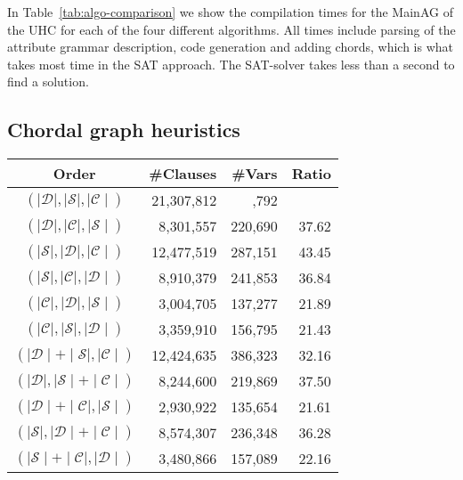 \documentclass{llncs}
\newcommand{\tabref}[1]{Table~\ref{#1}}
\begin{document}
In \tabref{tab:algo-comparison} we show the compilation times for the MainAG of the UHC for each of the four different algorithms. All times include parsing of the attribute grammar description, code generation and adding chords, which is what takes most time in the SAT approach. The SAT-solver takes less than a second to find a solution.

\subsection{Chordal graph heuristics} \label{sect:heuristics}
\begin{table}
  \begin{center}
    \begin{tabular}{c r r r }
      Order                                   &   \#Clauses   & \#Vars       & Ratio \\
      \hline
      $(\mid\mathcal{D}\mid,\mid\mathcal{S}\mid,\mid\mathcal{C}\mid)$ &  21,307,812  & \quad 374,792           & \quad 57.85 \\
      $(\mid\mathcal{D}\mid,\mid\mathcal{C}\mid,\mid\mathcal{S}\mid)$ &   8,301,557   & 220,690           & 37.62 \\
      $(\mid\mathcal{S}\mid,\mid\mathcal{D}\mid,\mid\mathcal{C}\mid)$ &  12,477,519   & 287,151           & 43.45 \\
      $(\mid\mathcal{S}\mid,\mid\mathcal{C}\mid,\mid\mathcal{D}\mid)$ &   8,910,379   & 241,853           & 36.84 \\
      $(\mid\mathcal{C}\mid,\mid\mathcal{D}\mid,\mid\mathcal{S}\mid)$ &   3,004,705   & 137,277           & 21.89 \\
      $(\mid\mathcal{C}\mid,\mid\mathcal{S}\mid,\mid\mathcal{D}\mid)$ &   3,359,910   & 156,795           & 21.43 \\
      $(\mid\mathcal{D}\mid+\mid\mathcal{S}\mid,\mid\mathcal{C}\mid)$     &  12,424,635   & 386,323           & 32.16 \\
      $(\mid\mathcal{D}\mid,\mid\mathcal{S}\mid+\mid\mathcal{C}\mid)$     &   8,244,600   & 219,869           & 37.50 \\
      $(\mid\mathcal{D}\mid+\mid\mathcal{C}\mid,\mid\mathcal{S}\mid)$     &   2,930,922   & 135,654           & 21.61 \\
      $(\mid\mathcal{S}\mid,\mid\mathcal{D}\mid+\mid\mathcal{C}\mid)$     &   8,574,307   & 236,348           & 36.28 \\
      $(\mid\mathcal{S}\mid+\mid\mathcal{C}\mid,\mid\mathcal{D}\mid)$     &   3,480,866   & 157,089           & 22.16 \\

\end{tabular}
\end{center}
\end{table}
\end{document}
